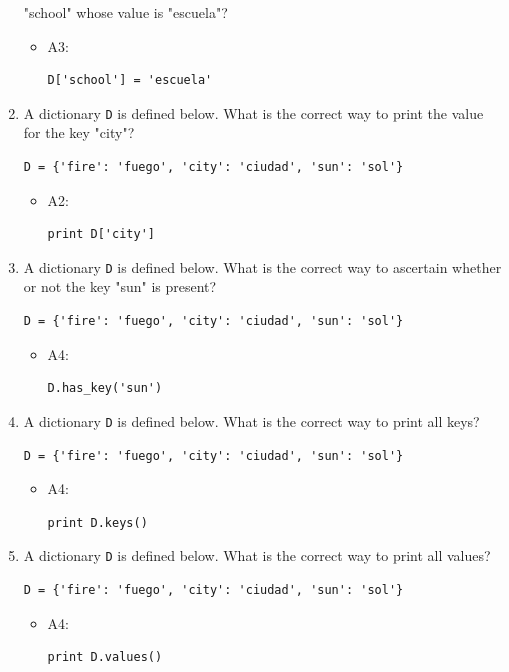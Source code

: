 \documentclass[article,A4,12pt]{llncs}
\begin{document}
\begin{enumerate}
"school" whose value is "escuela"? 
  \begin{itemize}
    \item A3:
\begin{verbatim}
D['school'] = 'escuela'
\end{verbatim}
  \end{itemize}
\item A dictionary {\tt D} is defined below. What is the correct way to print the value for 
the key "city"?
\begin{verbatim}
D = {'fire': 'fuego', 'city': 'ciudad', 'sun': 'sol'}
\end{verbatim}
  \begin{itemize}
    \item A2:
\begin{verbatim}
print D['city']
\end{verbatim}
  \end{itemize}
\item A dictionary {\tt D} is defined below. What is the correct way to ascertain whether
or not the key "sun" is present?
\begin{verbatim}
D = {'fire': 'fuego', 'city': 'ciudad', 'sun': 'sol'}
\end{verbatim}
  \begin{itemize}
    \item A4:
\begin{verbatim}
D.has_key('sun')
\end{verbatim}
  \end{itemize}
\item A dictionary {\tt D} is defined below. What is the correct way to print 
all keys?
\begin{verbatim}
D = {'fire': 'fuego', 'city': 'ciudad', 'sun': 'sol'}
\end{verbatim}
  \begin{itemize}
    \item A4:
\begin{verbatim}
print D.keys()
\end{verbatim}
  \end{itemize}
\item A dictionary {\tt D} is defined below. What is the correct way to print 
all values?
\begin{verbatim}
D = {'fire': 'fuego', 'city': 'ciudad', 'sun': 'sol'}
\end{verbatim}
  \begin{itemize}
    \item A4:
\begin{verbatim}
print D.values()
\end{verbatim}
  \end{itemize}
\end{enumerate}
\end{document}
